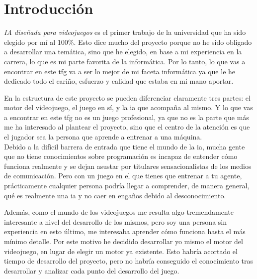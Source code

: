
\chapter{Introducción}
\label{introduccion}
\textit{IA diseñada para videojuegos} es el primer trabajo de la universidad que ha sido  elegido por mí al 100\%. Esto dice mucho del proyecto porque no he sido obligado a desarrollar una temática, sino que he elegido, en base a mi experiencia en la carrera, lo que es mi parte favorita de la informática. Por lo tanto, lo que vas a encontrar en este \gls{tfg} va a ser lo mejor de mi faceta informática ya que le he dedicado todo el cariño, esfuerzo y calidad que estaba en mi mano aportar.

En la estructura de este proyecto se pueden diferenciar claramente tres partes: el motor del videojuego, el juego en sí, y la \gls{ia} que acompaña al mismo. Y lo que vas a encontrar en este \gls{tfg} no es un juego profesional, ya que no es la parte que más me ha interesado al plantear el proyecto, sino que el centro de la atención es que el jugador sea la persona que aprende a entrenar a una máquina. 
\\
Debido a la difícil barrera de entrada que tiene el mundo de la \gls{ia}, mucha gente que no tiene conocimientos sobre programación es incapaz de entender cómo funciona realmente y se dejan asustar por titulares sensacionalistas de los medios de comunicación. Pero con un juego en el que tienes que entrenar a tu agente, prácticamente cualquier persona podría llegar a comprender, de manera general, qué es realmente una \gls{ia} y no caer en engaños debido al desconocimiento.

Además, como el mundo de los videojuegos me resulta algo tremendamente interesante a nivel del desarrollo de los mismos, pero soy una persona sin experiencia en esto último, me interesaba aprender cómo funciona hasta el más mínimo detalle. Por este motivo he decidido desarrollar yo mismo el motor del videojuego, en lugar de elegir un motor ya existente. Esto habría acortado el tiempo de desarrollo del proyecto, pero no habría conseguido el conocimiento tras desarrollar y analizar cada punto del desarrollo del juego.

